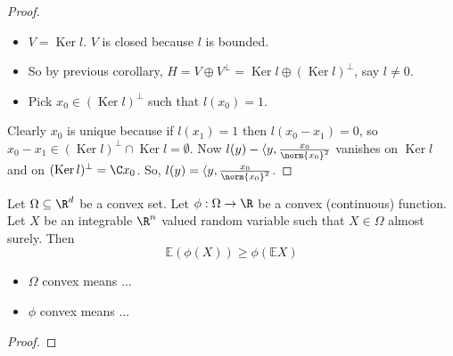 \documentclass{article}
\newcommand{\1}[1]{\mathbbm{1}_{#1}}
\newcommand{\E}{\mathbb{E}}
\DeclareMathOperator{\Ker}{Ker}
\begin{document}
\begin{proof}
    \leavevmode
    \begin{itemize}
        \item $V = \Ker l$. $V$ is closed because $l$ is bounded.
        \item So by previous corollary, $H = V \oplus V^\bot = \Ker l \oplus (\Ker l)^\bot$, say $l \neq 0$.
        \item Pick $x_0 \in (\Ker l)^\bot$ such that $l(x_0) = 1$.
    \end{itemize}
    Clearly $x_0$ is unique because if $l(x_1) = 1$ then $l(x_0 - x_1) = 0$, so $x_0 - x_1 \in (\Ker l)^\bot \cap \Ker l = \emptyset$.
    Now $l(y) - \langle y, \frac{x_0}{\norm{x_0}^2}$ vanishes on $\Ker l$ and on $(\Ker l)^\bot = \C x_0$. %
    So, $l(y) = \langle y, \frac{x_0}{\norm{x_0}^2}$.
\end{proof}

\begin{thm}
    Let $\Omega \subseteq \R^d$ be a convex set.
    Let $\phi: \Omega \to \R$ be a convex (continuous) function.
    Let $X$ be an integrable $\R^n$ valued random variable such that $X \in \Omega$ almost surely.
    Then
    \begin{equation*}
        \E(\phi(X)) \geq \phi(\E X)
    \end{equation*}
\end{thm}

\begin{remark}
    \leavevmode
    \begin{itemize}
        \item $\Omega$ convex means ...
        \item $\phi$ convex means ...
    \end{itemize}
\end{remark}

\begin{proof}

\end{proof}
\end{document}
